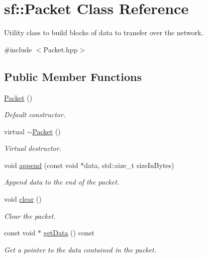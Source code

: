 \hypertarget{classsf_1_1_packet}{}\section{sf\+:\+:Packet Class Reference}
\label{classsf_1_1_packet}


Utility class to build blocks of data to transfer over the network.  




{\ttfamily \#include $<$Packet.\+hpp$>$}

\subsection*{Public Member Functions}
\begin{DoxyCompactItemize}
\item 
\hyperlink{classsf_1_1_packet_a786e5d4ced83992ceefa1799963ea858}{Packet} ()
\begin{DoxyCompactList}\small\item\em Default constructor. \end{DoxyCompactList}\item 
\mbox{\label{classsf_1_1_packet_adc0490ca3c7c3d1e321bd742e5213913}} 
virtual \hyperlink{classsf_1_1_packet_adc0490ca3c7c3d1e321bd742e5213913}{$\sim$\+Packet} ()
\begin{DoxyCompactList}\small\item\em Virtual destructor. \end{DoxyCompactList}\item 
void \hyperlink{classsf_1_1_packet_a7dd6e429b87520008326c4d71f1cf011}{append} (const void $\ast$data, std\+::size\+\_\+t size\+In\+Bytes)
\begin{DoxyCompactList}\small\item\em Append data to the end of the packet. \end{DoxyCompactList}\item 
void \hyperlink{classsf_1_1_packet_a133ea8b8fe6e93c230f0d79f19a3bf0d}{clear} ()
\begin{DoxyCompactList}\small\item\em Clear the packet. \end{DoxyCompactList}\item 
const void $\ast$ \hyperlink{classsf_1_1_packet_abfd771803c822f89f187e1fcc2af5afc}{get\+Data} () const
\begin{DoxyCompactList}\small\item\em Get a pointer to the data contained in the packet. \end{DoxyCompactList}\item 

\end{DoxyCompactItemize}
